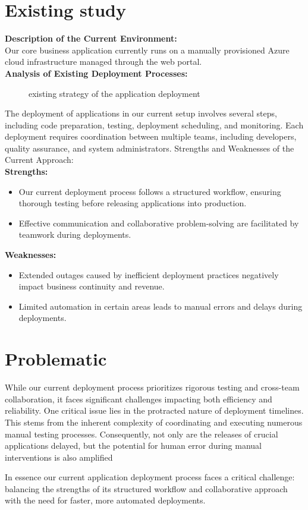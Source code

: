 \section{Existing study}

\noindent
\textbf{Description of the Current Environment:}
\\
Our core business application currently runs on a manually provisioned Azure cloud infrastructure managed through the web portal.
\\
\textbf{Analysis of Existing Deployment Processes:}

\begin{figure}[htpb]
    \centering
    \caption{existing strategy of the application deployment}
    \label{fig:existing_strategy}
\end{figure}

The deployment of applications in our current setup involves several steps, including code preparation, testing, deployment scheduling, and monitoring. Each deployment requires coordination between multiple teams, including developers, quality assurance, and system administrators.
Strengths and Weaknesses of the Current Approach:
\\
\textbf{Strengths:}
\begin{itemize}
    \item Our current deployment process follows a structured workflow, ensuring thorough testing before releasing applications into production.
    \item Effective communication and collaborative problem-solving are facilitated by teamwork during deployments.
\end{itemize}
\textbf{Weaknesses:}
\begin{itemize}
    \item Extended outages caused by inefficient deployment practices negatively impact business continuity and revenue.
    \item Limited automation in certain areas leads to manual errors and delays during deployments.
\end{itemize}

\section{Problematic}
While our current deployment process prioritizes rigorous testing and cross-team collaboration, it faces significant challenges impacting both efficiency and reliability. One critical issue lies in the protracted nature of deployment timelines. This stems from the inherent complexity of coordinating and executing numerous manual testing processes. Consequently, not only are the releases of crucial applications delayed, but the potential for human error during manual interventions is also amplified
\par
In essence our current application deployment process faces a critical challenge: balancing the strengths of its structured workflow and collaborative approach with the need for faster, more automated deployments.

